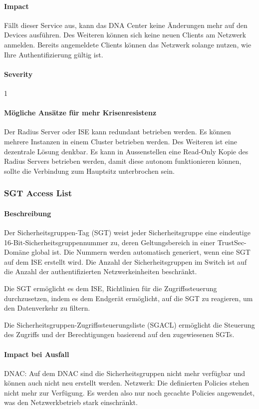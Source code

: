 \paragraph{Impact}

Fällt dieser Service aus, kann das DNA Center keine Änderungen mehr auf den Devices ausführen. Des Weiteren können sich keine neuen Clients am Netzwerk anmelden. Bereits angemeldete Clients können das Netzwerk solange nutzen, wie Ihre Authentifizierung gültig ist.

\paragraph{Severity} 1

\paragraph{Mögliche Ansätze für mehr Krisenresistenz}

Der Radius Server oder ISE kann redundant betrieben werden. Es können mehrere Instanzen in einem Cluster betrieben werden. Des Weiteren ist eine dezentrale Lösung denkbar. Es kann in Aussenstellen eine Read-Only Kopie des Radius Servers betrieben werden, damit diese autonom funktionieren können, sollte die Verbindung zum Hauptsitz unterbrochen sein.

\subsubsection{SGT Access List}
\paragraph{Beschreibung}
Der Sicherheitsgruppen-Tag (SGT) weist jeder Sicherheitsgruppe eine eindeutige 16-Bit-Sicherheitsgruppennummer zu, deren Geltungsbereich in einer TrustSec-Domäne global ist. Die Nummern werden automatisch generiert, wenn eine SGT auf dem ISE erstellt wird. Die Anzahl der Sicherheitsgruppen im Switch ist auf die Anzahl der authentifizierten Netzwerkeinheiten beschränkt.

Die SGT ermöglicht es dem ISE, Richtlinien für die Zugriffssteuerung durchzusetzen, indem es dem Endgerät ermöglicht, auf die SGT zu reagieren, um den Datenverkehr zu filtern.

Die Sicherheitsgruppen-Zugriffssteuerungsliste (SGACL) ermöglicht die Steuerung des Zugriffs und der Berechtigungen basierend auf den zugewiesenen SGTs.

\paragraph{Impact bei Ausfall}
DNAC: Auf dem DNAC sind die Sicherheitsgruppen nicht mehr verfügbar und können auch nicht neu erstellt werden.
Netzwerk: Die definierten Policies stehen nicht mehr zur Verfügung. Es werden also nur noch gecachte Policies angewendet, was den Netzwerkbetrieb stark einschränkt. 

